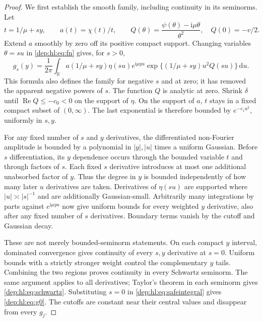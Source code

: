 \documentclass[11pt]{article}
\theoremstyle{definition}\newtheorem{definition}[theorem]{Definition}
\theoremstyle{remark}\newtheorem{remark}[theorem]{Remark}
\newcommand{\ii}{\mathrm i}
\newcommand{\dd}{\,\mathrm d}
\newcommand{\RR}{\mathbb R}
\DeclareMathOperator{\Repart}{Re}
\begin{document}
\begin{proof}
We first establish the smooth family, including continuity in its
seminorms. Let
\[
 t=1/\mu+sy,\qquad a(t)=\chi(t)/t,\qquad
 Q(\theta)=\frac{\psi(\theta)-\ii\mu\theta}{\theta^2},
 \quad Q(0)=-v/2.
\]
Extend $a$ smoothly by zero off its positive compact support. Changing
variables $\theta=su$ in \eqref{dep:hl:eq:fn} gives, for $s>0$,
\begin{equation}\label{dep:hl:eq:safeintegral}
 g_s(y)=\frac1{2\pi}\int_\RR a(1/\mu+sy)\eta(su)
 e^{\ii\mu yu}\exp\{(1/\mu+sy)u^2Q(su)\}\dd u.
\end{equation}
This formula also defines the family for negative $s$ and at zero; it
has removed the apparent negative powers of $s$. The function $Q$ is
analytic at zero. Shrink $\delta$ until $\Repart Q\le-c_0<0$ on the
support of $\eta$. On the support of $a$, $t$ stays in a fixed compact
subset of $(0,\infty)$. The last exponential is therefore bounded by
$e^{-c_1u^2}$, uniformly in $s,y$.

For any fixed number of $s$ and $y$ derivatives, the differentiated
non-Fourier amplitude is bounded by a polynomial in $|y|,|u|$ times a
uniform Gaussian. Before $s$ differentiation, its $y$ dependence
occurs through the bounded variable $t$ and through factors of $s$.
Each fixed $s$ derivative introduces at most one additional unabsorbed
factor of $y$. Thus the degree in $y$ is bounded independently of how
many later $u$ derivatives are taken. Derivatives of $\eta(su)$ are
supported where $|u|\asymp |s|^{-1}$ and are additionally Gaussian-small.
Arbitrarily many integrations by parts against $e^{\ii\mu yu}$ now
give uniform bounds for every weighted $y$ derivative, also after any
fixed number of $s$ derivatives. Boundary terms vanish by the cutoff
and Gaussian decay.

These are not merely bounded-seminorm statements. On each compact
$y$ interval, dominated convergence gives continuity of every
$s,y$ derivative at $s=0$. Uniform bounds with a strictly stronger
weight control the complementary $y$ tails. Combining the two regions
proves continuity in every Schwartz seminorm. The same argument applies
to all derivatives; Taylor's theorem in each seminorm gives
\eqref{dep:hl:eq:schwartz}. Substituting $s=0$ in
\eqref{dep:hl:eq:safeintegral} gives \eqref{dep:hl:eq:g0}. The cutoffs are constant
near their central values and disappear from every $g_j$.


\end{proof}
\end{document}
